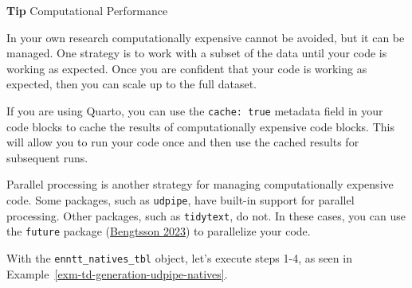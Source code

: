 \documentclass[
  letterpaper,
  DIV=11,
  numbers=noendperiod]{scrreport}
\theoremstyle{definition}
\theoremstyle{remark}
\begin{document}
\begin{tcolorbox}[enhanced jigsaw, breakable, colback=white, rightrule=.15mm, arc=.35mm, left=2mm, toprule=.15mm, leftrule=.75mm, bottomrule=.15mm, opacityback=0]

\textbf{ Tip} Computational Performance

In your own research computationally expensive cannot be avoided, but it
can be managed. One strategy is to work with a subset of the data until
your code is working as expected. Once you are confident that your code
is working as expected, then you can scale up to the full dataset.

If you are using Quarto, you can use the \texttt{cache:\ true} metadata
field in your code blocks to cache the results of computationally
expensive code blocks. This will allow you to run your code once and
then use the cached results for subsequent runs.

Parallel processing is another strategy for managing computationally
expensive code. Some packages, such as \texttt{udpipe}, have built-in
support for parallel processing. Other packages, such as
\texttt{tidytext}, do not. In these cases, you can use the
\texttt{future} package (\protect\hyperlink{ref-R-future}{Bengtsson
2023}) to parallelize your code.

\end{tcolorbox}

With the \texttt{enntt\_natives\_tbl} object, let's execute steps 1-4,
as seen in Example~\ref{exm-td-generation-udpipe-natives}.
\end{document}
